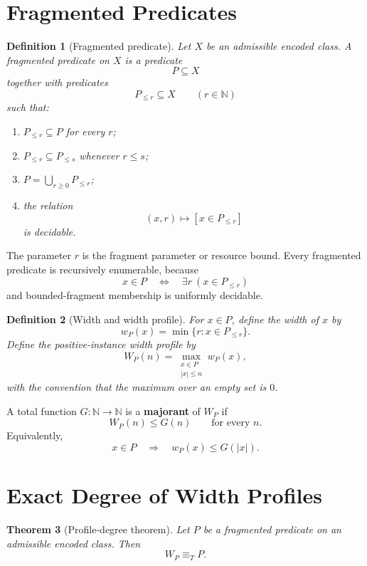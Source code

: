 \documentclass[11pt]{article}
\newtheorem{theorem}{Theorem}[section]
\newtheorem{definition}[theorem]{Definition}
\begin{document}
\section{Fragmented Predicates}

\begin{definition}[Fragmented predicate]
Let \(X\) be an admissible encoded class. A fragmented predicate on \(X\) is a predicate
\[
P\subseteq X
\]
together with predicates
\[
P_{\le r}\subseteq X
\qquad
(r\in\mathbb N)
\]
such that:
\begin{enumerate}[label=(\roman*)]
\item \(P_{\le r}\subseteq P\) for every \(r\);
\item \(P_{\le r}\subseteq P_{\le s}\) whenever \(r\le s\);
\item \(P=\bigcup_{r\ge0}P_{\le r}\);
\item the relation
\[
(x,r)\longmapsto [x\in P_{\le r}]
\]
is decidable.
\end{enumerate}
\end{definition}

The parameter \(r\) is the fragment parameter or resource bound. Every fragmented predicate is recursively enumerable, because
\[
x\in P
\quad\Longleftrightarrow\quad
\exists r\ (x\in P_{\le r})
\]
and bounded-fragment membership is uniformly decidable.

\begin{definition}[Width and width profile]
For \(x\in P\), define the width of \(x\) by
\[
w_P(x)=\min\{r:x\in P_{\le r}\}.
\]
Define the positive-instance width profile by
\[
W_P(n)=
\max_{\substack{x\in P\\ |x|\le n}}
w_P(x),
\]
with the convention that the maximum over an empty set is \(0\).
\end{definition}

A total function \(G:\mathbb N\to\mathbb N\) is a \textbf{majorant} of \(W_P\) if
\[
W_P(n)\le G(n)
\qquad
\text{for every }n.
\]
Equivalently,
\[
x\in P
\quad\Longrightarrow\quad
w_P(x)\le G(|x|).
\]

\section{Exact Degree of Width Profiles}

\begin{theorem}[Profile-degree theorem]
Let \(P\) be a fragmented predicate on an admissible encoded class. Then
\[
W_P\equiv_T P.
\]
\end{theorem}
\end{document}

